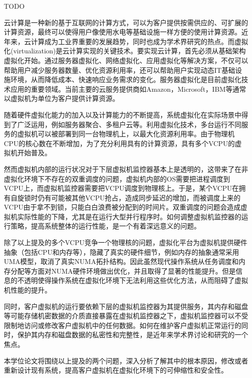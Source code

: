 \begin{englishabstract}

TODO

云计算是一种新的基于互联网的计算方式，可以为客户提供按需供应的、可扩展的计算资源，最终可以使得用户像使用水电等基础设施一样方便的使用计算资源。近年来，云计算成为工业界重要的发展趋势，同时也成为学术界研究的热点。而虚拟化(virtualization)是云计算实现的关键技术。要实现云计算，首先必须从基础架构虚拟化开始。通过服务器虚拟化、网络虚拟化、应用虚拟化等解决方案，不仅可以帮助用户减少服务器数量、优化资源利用率，还可以帮助用户实现动态IT基础设施环境，从而降低成本、快速响应业务需求的变化。服务器虚拟化是目前虚拟化技术应用的重要领域。当前主要的云服务提供商如Amazon，Microsoft，IBM等通常以虚拟机为单位为客户提供计算资源。

随着硬件虚拟化能力的加入以及计算能力的不断提高，系统虚拟化在实际场景中得到了广泛运用，例如服务器聚合、多租户云等。利用虚拟化技术，多台运行不同服务的虚拟机可以被部署到同一台物理机上，以最大化资源利用率。由于物理机CPU的核心数在不断增加，为了充分利用具有的计算资源，具有多个VCPU的虚拟机开始普及。

然而虚拟机内部的运行状况对于下层虚拟机监控器基本上是透明的，这带来了在非虚拟化环境下不存在的双重调度的问题，虚拟机内部的OS需要把进程调度到VCPU上，而虚拟机监控器需要把VCPU调度到物理核上。于是，某个VCPU在拥有自旋锁时仍有可能被其他VCPU抢占，造成同步延迟的增加，而被调度上来的VCPU由于拿不到锁，只能白白浪费被分配到的时间片。双重调度的问题会造成虚拟机实际性能的下降，尤其是在运行大型并行程序时。如何调整虚拟机监控器的运行策略，提高系统整体的运行性能，是一个有着深远意义的问题。

除了以上提及的多个VCPU竞争一个物理核的问题，虚拟化平台为虚拟机提供硬件抽象（包括CPU和内存等），隐藏了真实的硬件细节，例如内存的抽象通常采用UMA模型，取消了真实NUMA拓扑结构。因此虽然现代操作系统从任务调度和内存分配等方面对NUMA硬件环境做出优化，并且取得了显著的性能提升。但是信息的不透明使得操作系统在虚拟化环境下无法利用这些优化方法，从而阻碍了虚拟机性能的提升。

同时，客户虚拟机的运行要依赖下层的虚拟机监控器为其提供服务，其内存和磁盘等可能存储机密数据的介质直接暴露在虚拟机监控器之下，虚拟机监控器可以不受限制地访问或修改客户虚拟机中的任何数据。如何在维护客户虚拟机正常运行的同时，保护其内存和磁盘数据的私密性和完整性，是近年来学术界讨论和研究的一个焦点。

本学位论文将围绕以上提及的两个问题，深入分析了解其中的根本原因，修改或者重新设计现有系统，提高客户虚拟机在虚拟化环境下的可伸缩性和安全性。

\end{englishabstract}
